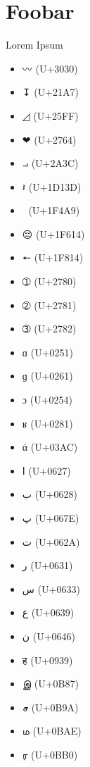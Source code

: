 \documentclass[a4paper]{article}
\begin{document}
\section{Foobar}

Lorem Ipsum

\begin{itemize}

    \item {\libertine 〰 } (U+3030)
    \item {\libertine ↧ } (U+21A7)

    \item {\libertine ◿ } (U+25FF)
    \item {\libertine ❤ } (U+2764)
    \item {\libertine ⨼ } (U+2A3C)
    \item {\libertine 𝄽 } (U+1D13D)
    \item {\libertine 💩 } (U+1F4A9)
    \item {\libertine 😔 } (U+1F614)
    \item {\libertine 🠔 } (U+1F814)
    \item {\libertine ➀ } (U+2780)
    \item {\libertine ➁ } (U+2781)
    \item {\libertine ➂ } (U+2782)
    \item {\libertine ɑ } (U+0251)
    \item {\libertine ɡ } (U+0261)
    \item {\libertine ɔ } (U+0254)
    \item {\libertine ʁ } (U+0281)
    \item {\libertine ά } (U+03AC)
    \item {\libertine ا } (U+0627)
    \item {\libertine ب } (U+0628)
    \item {\libertine پ } (U+067E)
    \item {\libertine ت } (U+062A)
    \item {\libertine ر } (U+0631)
    \item {\libertine س } (U+0633)
    \item {\libertine ع } (U+0639)
    \item {\libertine ن } (U+0646)
    \item {\libertine ह } (U+0939)
    \item {\libertine இ } (U+0B87)
    \item {\libertine ச } (U+0B9A)
    \item {\libertine ம } (U+0BAE)
    \item {\libertine ர } (U+0BB0)

\end{itemize}
\end{document}

